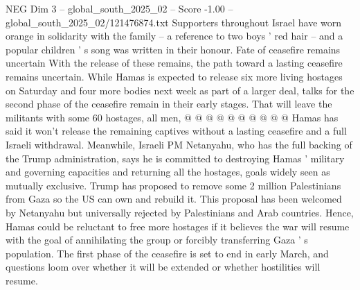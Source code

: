 \begin{textsample}{NEG Dim 3 – global\_south\_2025\_02 – Score -1.00 – global\_south\_2025\_02/121476874.txt}
Supporters throughout Israel have worn orange in solidarity with the family -- a reference to two boys ' red hair -- and a popular children ' s song was written in their honour.
Fate of ceasefire remains uncertain With the release of these remains, the path toward a lasting ceasefire remains uncertain.
While Hamas is expected to release six more living hostages on Saturday and four more bodies next week as part of a larger deal, talks for the second phase of the ceasefire remain in their early stages.
That will leave the militants with some 60 hostages, all men, @ @ @ @ @ @ @ @ @ @ Hamas has said it won't release the remaining captives without a lasting ceasefire and a full Israeli withdrawal.
Meanwhile, Israeli PM Netanyahu, who has the full backing of the Trump administration, says he is committed to destroying Hamas ' military and governing capacities and returning all the hostages, goals widely seen as mutually exclusive.
Trump has proposed to remove some 2 million Palestinians from Gaza so the US can own and rebuild it.
This proposal has been welcomed by Netanyahu but universally rejected by Palestinians and Arab countries.
Hence, Hamas could be reluctant to free more hostages if it believes the war will resume with the goal of annihilating the group or forcibly transferring Gaza ' s population.
The first phase of the ceasefire is set to end in early March, and questions loom over whether it will be extended or whether hostilities will resume.

\end{textsample}
